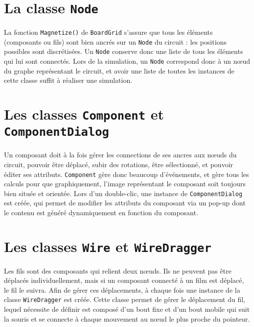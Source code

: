 \section{La classe \lstinline|Node|}

\paragraph{}La fonction \lstinline|Magnetize()| de \lstinline|BoardGrid| s'assure que tous les éléments (composants ou fils) sont bien ancrés sur un \lstinline|Node| du circuit : les positions possibles sont discrétisées. Un \lstinline|Node| conserve donc une liste de tous les éléments qui lui sont connectés. Lors de la simulation, un \lstinline|Node| correspond donc à un nœud du graphe représentant le circuit, et avoir une liste de toutes les instances de cette classe suffit à réaliser une simulation.


\section{Les classes \lstinline|Component| et \lstinline|ComponentDialog|}

\paragraph{}Un composant doit à la fois gérer les connections de ses ancres aux nœuds du circuit, pouvoir être déplacé, subir des rotations, être sélectionné, et pouvoir éditer ses attributs. \lstinline|Component| gère donc beaucoup d'événements, et gère tous les calculs pour que graphiquement, l'image représentant le composant soit toujours bien située et orientée. Lors d'un double-clic, une instance de \lstinline|ComponentDialog| est créée, qui permet de modifier les attributs du composant via un pop-up dont le contenu est généré dynamiquement en fonction du composant.


\section{Les classes \lstinline|Wire| et \lstinline|WireDragger|}

\paragraph{}Les fils sont des composants qui relient deux nœuds. Ils ne peuvent pas être déplacés individuellement, mais si un composant connecté à un film est déplacé, le fil le suivra. Afin de gérer ces déplacements, à chaque fois une instance de la classe \lstinline|WireDragger| est créée. Cette classe permet de gérer le déplacement du fil, lequel nécessite de définir est composé d'un bout fixe et d'un bout mobile qui suit la souris et se connecte à chaque mouvement au nœud le plus proche du pointeur.

